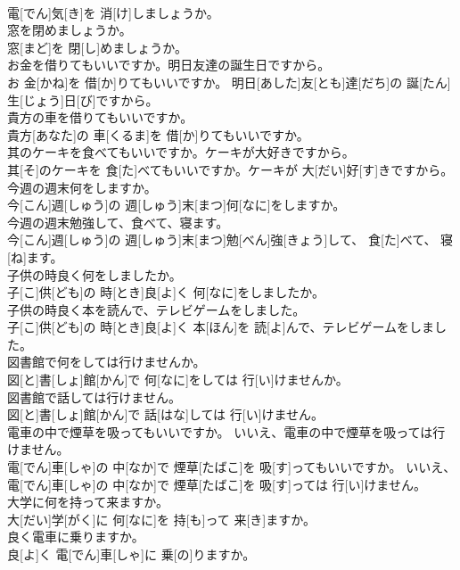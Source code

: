 \documentclass[8pt]{extreport}
\begin{document}
\begin{CJK}{UTF8}{min}
\\	電[でん]気[き]を 消[け]しましょうか。
\\	窓を閉めましょうか。	
\\	窓[まど]を 閉[し]めましょうか。
\\	お金を借りてもいいですか。明日友達の誕生日ですから。	
\\	お 金[かね]を 借[か]りてもいいですか。 明日[あした]友[とも]達[だち]の 誕[たん]生[じょう]日[び]ですから。
\\	貴方の車を借りてもいいですか。	
\\	貴方[あなた]の 車[くるま]を 借[か]りてもいいですか。
\\	其のケーキを食べてもいいですか。ケーキが大好きですから。	
\\	其[そ]のケーキを 食[た]べてもいいですか。ケーキが 大[だい]好[す]きですから。
\\	今週の週末何をしますか。	
\\	今[こん]週[しゅう]の 週[しゅう]末[まつ]何[なに]をしますか。
\\	今週の週末勉強して、食べて、寝ます。	
\\	今[こん]週[しゅう]の 週[しゅう]末[まつ]勉[べん]強[きょう]して、 食[た]べて、 寝[ね]ます。
\\	子供の時良く何をしましたか。	
\\	子[こ]供[ども]の 時[とき]良[よ]く 何[なに]をしましたか。
\\	子供の時良く本を読んで、テレビゲームをしました。	
\\	子[こ]供[ども]の 時[とき]良[よ]く 本[ほん]を 読[よ]んで、テレビゲームをしました。
\\	図書館で何をしては行けませんか。	
\\	図[と]書[しょ]館[かん]で 何[なに]をしては 行[い]けませんか。
\\	図書館で話しては行けません。	
\\	図[と]書[しょ]館[かん]で 話[はな]しては 行[い]けません。
\\	電車の中で煙草を吸ってもいいですか。 いいえ、電車の中で煙草を吸っては行けません。	
\\	電[でん]車[しゃ]の 中[なか]で 煙草[たばこ]を 吸[す]ってもいいですか。 いいえ、 電[でん]車[しゃ]の 中[なか]で 煙草[たばこ]を 吸[す]っては 行[い]けません。
\\	大学に何を持って来ますか。	
\\	大[だい]学[がく]に 何[なに]を 持[も]って 来[き]ますか。
\\	良く電車に乗りますか。	
\\	良[よ]く 電[でん]車[しゃ]に 乗[の]りますか。

\end{CJK}
\end{document}
